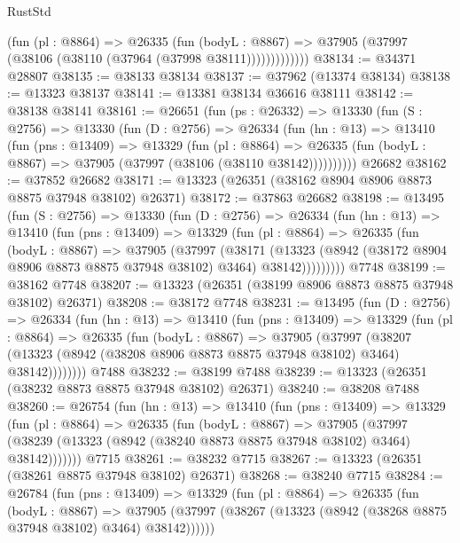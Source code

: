 \begin{lexlean}{RustStd}
\begin{coremodule}
                (fun (pl : @8864) =>
                @26335
                  (fun (bodyL : @8867) =>
                  @37905 (@37997 (@38106 (@38110 (@37964 (@37998 @38111)))))))))))))
@38134 := @34371 @28807
@38135 := @38133 @38134
@38137 := @37962 (@13374 @38134)
@38138 := @13323 @38137
@38141 := @13381 @38134 @36616 @38111
@38142 := @38138 @38141
@38161 := @26651
    (fun (ps : @26332) =>
    @13330
      (fun (S : @2756) =>
      @13330
        (fun (D : @2756) =>
        @26334
          (fun (hn : @13) =>
          @13410
            (fun (pns : @13409) =>
            @13329
              (fun (pl : @8864) =>
              @26335 (fun (bodyL : @8867) => @37905 (@37997 (@38106 (@38110 @38142))))))))))
    @26682
@38162 := @37852 @26682
@38171 := @13323 (@26351 (@38162 @8904 @8906 @8873 @8875 @37948 @38102) @26371)
@38172 := @37863 @26682
@38198 := @13495
    (fun (S : @2756) =>
    @13330
      (fun (D : @2756) =>
      @26334
        (fun (hn : @13) =>
        @13410
          (fun (pns : @13409) =>
          @13329
            (fun (pl : @8864) =>
            @26335
              (fun (bodyL : @8867) =>
              @37905
                (@37997
                  (@38171
                    (@13323
                      (@8942 (@38172 @8904 @8906 @8873 @8875 @37948 @38102) @3464)
                      @38142)))))))))
    @7748
@38199 := @38162 @7748
@38207 := @13323 (@26351 (@38199 @8906 @8873 @8875 @37948 @38102) @26371)
@38208 := @38172 @7748
@38231 := @13495
    (fun (D : @2756) =>
    @26334
      (fun (hn : @13) =>
      @13410
        (fun (pns : @13409) =>
        @13329
          (fun (pl : @8864) =>
          @26335
            (fun (bodyL : @8867) =>
            @37905
              (@37997
                (@38207
                  (@13323 (@8942 (@38208 @8906 @8873 @8875 @37948 @38102) @3464) @38142))))))))
    @7488
@38232 := @38199 @7488
@38239 := @13323 (@26351 (@38232 @8873 @8875 @37948 @38102) @26371)
@38240 := @38208 @7488
@38260 := @26754
    (fun (hn : @13) =>
    @13410
      (fun (pns : @13409) =>
      @13329
        (fun (pl : @8864) =>
        @26335
          (fun (bodyL : @8867) =>
          @37905
            (@37997 (@38239 (@13323 (@8942 (@38240 @8873 @8875 @37948 @38102) @3464) @38142)))))))
    @7715
@38261 := @38232 @7715
@38267 := @13323 (@26351 (@38261 @8875 @37948 @38102) @26371)
@38268 := @38240 @7715
@38284 := @26784
    (fun (pns : @13409) =>
    @13329
      (fun (pl : @8864) =>
      @26335
        (fun (bodyL : @8867) =>
        @37905 (@37997 (@38267 (@13323 (@8942 (@38268 @8875 @37948 @38102) @3464) @38142))))))

\end{coremodule}
\end{lexlean}
